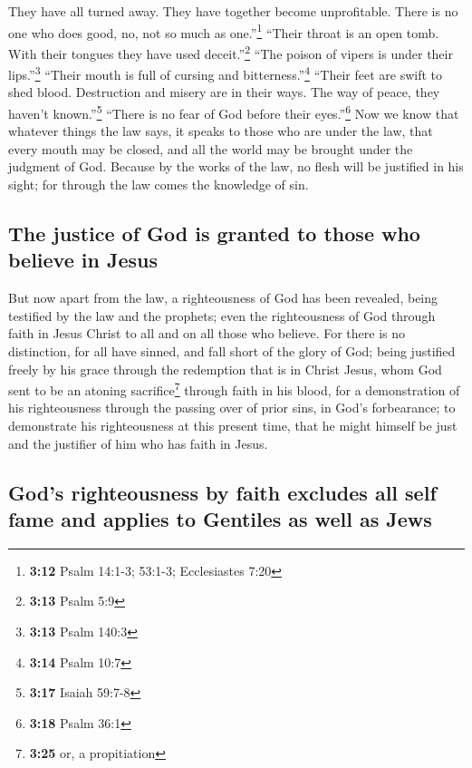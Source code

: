  They have all turned away. They have together become
unprofitable. There is no one who does good, no, not so much as
one.''\footnote{\textbf{3:12} Psalm 14:1-3; 53:1-3; Ecclesiastes 7:20}
 ``Their throat is an open tomb. With their tongues they
have used deceit.''\footnote{\textbf{3:13} Psalm 5:9} ``The poison of
vipers is under their lips.''\footnote{\textbf{3:13} Psalm 140:3}
 ``Their mouth is full of cursing and
bitterness.''\footnote{\textbf{3:14} Psalm 10:7}  ``Their
feet are swift to shed blood.  Destruction and misery are
in their ways.  The way of peace, they haven't
known.''\footnote{\textbf{3:17} Isaiah 59:7-8}  ``There
is no fear of God before their eyes.''\footnote{\textbf{3:18} Psalm 36:1}
 Now we know that whatever things the law says, it speaks
to those who are under the law, that every mouth may be closed, and all
the world may be brought under the judgment of God. 
Because by the works of the law, no flesh will be justified in his
sight; for through the law comes the knowledge of sin.

\hypertarget{the-justice-of-god-is-granted-to-those-who-believe-in-jesus}{%
\subsection{The justice of God is granted to those who believe in
Jesus}\label{the-justice-of-god-is-granted-to-those-who-believe-in-jesus}}

 But now apart from the law, a righteousness of God has
been revealed, being testified by the law and the prophets;
 even the righteousness of God through faith in Jesus
Christ to all and on all those who believe. For there is no distinction,
 for all have sinned, and fall short of the glory of God;
 being justified freely by his grace through the
redemption that is in Christ Jesus,  whom God sent to be
an atoning sacrifice\footnote{\textbf{3:25} or, a propitiation} through
faith in his blood, for a demonstration of his righteousness through the
passing over of prior sins, in God's forbearance;  to
demonstrate his righteousness at this present time, that he might
himself be just and the justifier of him who has faith in Jesus.

\hypertarget{gods-righteousness-by-faith-excludes-all-self-fame-and-applies-to-gentiles-as-well-as-jews}{%
\subsection{God's righteousness by faith excludes all self fame and
applies to Gentiles as well as
Jews}\label{gods-righteousness-by-faith-excludes-all-self-fame-and-applies-to-gentiles-as-well-as-jews}}

